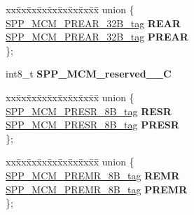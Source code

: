 \begin{DoxyCompactItemize}
\begin{tabbing}
\end{tabbing}\item 
\mbox{\label{structSPP__MCM__struct__tag_a456f5095701a85316e98fc7f4c0167b7}} 
\begin{tabbing}
xx\=xx\=xx\=xx\=xx\=xx\=xx\=xx\=xx\=\kill
union \{\\
\>\mbox{\hyperlink{unionSPP__MCM__PREAR__32B__tag}{SPP\_MCM\_PREAR\_32B\_tag}} {\bfseries REAR}\\
\>\mbox{\hyperlink{unionSPP__MCM__PREAR__32B__tag}{SPP\_MCM\_PREAR\_32B\_tag}} {\bfseries PREAR}\\
\}; \\

\end{tabbing}\item 
\mbox{\label{structSPP__MCM__struct__tag_af6709a48ca37ac9b4f572b69cea7c611}} 
int8\+\_\+t {\bfseries S\+P\+P\+\_\+\+M\+C\+M\+\_\+reserved\+\_\+\_\+C}
\item 
\mbox{\label{structSPP__MCM__struct__tag_a6cb4f1b51932bec6991fc99b0d5dcc0f}} 
\begin{tabbing}
xx\=xx\=xx\=xx\=xx\=xx\=xx\=xx\=xx\=\kill
union \{\\
\>\mbox{\hyperlink{unionSPP__MCM__PRESR__8B__tag}{SPP\_MCM\_PRESR\_8B\_tag}} {\bfseries RESR}\\
\>\mbox{\hyperlink{unionSPP__MCM__PRESR__8B__tag}{SPP\_MCM\_PRESR\_8B\_tag}} {\bfseries PRESR}\\
\}; \\

\end{tabbing}\item 
\mbox{\label{structSPP__MCM__struct__tag_a992f1b210e4a6a4697120e85fcbf8e91}} 
\begin{tabbing}
xx\=xx\=xx\=xx\=xx\=xx\=xx\=xx\=xx\=\kill
union \{\\
\>\mbox{\hyperlink{unionSPP__MCM__PREMR__8B__tag}{SPP\_MCM\_PREMR\_8B\_tag}} {\bfseries REMR}\\
\>\mbox{\hyperlink{unionSPP__MCM__PREMR__8B__tag}{SPP\_MCM\_PREMR\_8B\_tag}} {\bfseries PREMR}\\
\}; \\


\end{tabbing}
\end{DoxyCompactItemize}
